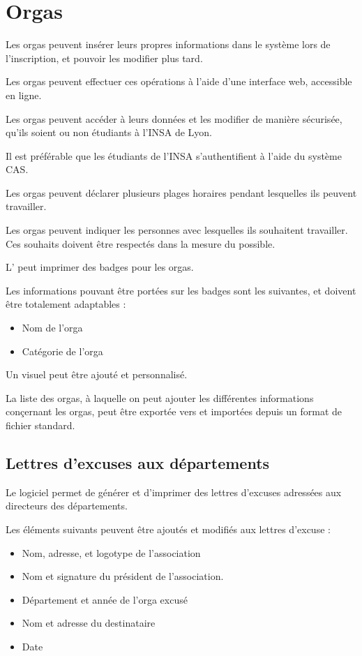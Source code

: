 
\section{Orgas}



Les orgas peuvent insérer leurs propres informations dans le système lors de l'inscription, et pouvoir les modifier plus tard.

Les orgas peuvent effectuer ces opérations à l'aide d'une interface web, accessible en ligne.

Les orgas peuvent accéder à leurs données et les modifier de manière sécurisée, qu'ils soient ou non étudiants à l'INSA de Lyon.

Il est préférable que les étudiants de l'INSA s'authentifient à l'aide du système CAS.

Les orgas peuvent déclarer plusieurs plages horaires pendant lesquelles ils peuvent travailler.

Les orgas peuvent indiquer les personnes avec lesquelles ils souhaitent travailler. Ces souhaits doivent être respectés dans la mesure du possible.

L'\oh{} peut imprimer des badges pour les orgas.

Les informations pouvant être portées sur les badges sont les suivantes, et doivent être totalement adaptables : 
\begin{itemize}
\item Nom de l'orga
\item Catégorie de l'orga
\end{itemize}

Un visuel peut être ajouté et personnalisé.


La liste des orgas, à laquelle on peut ajouter les différentes informations conçernant les orgas, peut être exportée vers et importées depuis un format de fichier standard.


\subsection{Lettres d'excuses aux départements}
Le logiciel permet de générer et d'imprimer des lettres d'excuses adressées aux directeurs des départements.

Les éléments suivants peuvent être ajoutés et modifiés aux lettres d'excuse : 
\begin{itemize}
 \item Nom, adresse, et logotype de l'association
\item Nom et signature du président de l'association.
\item Département et année de l'orga excusé
\item Nom et adresse du destinataire
\item Date
\end{itemize}


